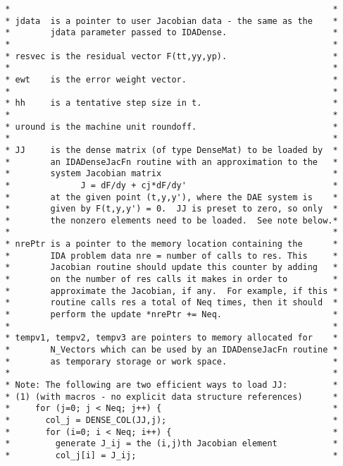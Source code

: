 \documentclass[11pt]{article}
\begin{document}
\begin{verbatim}
 *                                                                *
 * jdata  is a pointer to user Jacobian data - the same as the    *
 *        jdata parameter passed to IDADense.                     *
 *                                                                *
 * resvec is the residual vector F(tt,yy,yp).                     *
 *                                                                *
 * ewt    is the error weight vector.                             *
 *                                                                *
 * hh     is a tentative step size in t.                          *
 *                                                                *
 * uround is the machine unit roundoff.                           *
 *                                                                *
 * JJ     is the dense matrix (of type DenseMat) to be loaded by  *
 *        an IDADenseJacFn routine with an approximation to the   *
 *        system Jacobian matrix                                  *
 *              J = dF/dy + cj*dF/dy'                             *
 *        at the given point (t,y,y'), where the DAE system is    *
 *        given by F(t,y,y') = 0.  JJ is preset to zero, so only  *
 *        the nonzero elements need to be loaded.  See note below.*
 *                                                                *
 * nrePtr is a pointer to the memory location containing the      *
 *        IDA problem data nre = number of calls to res. This     *
 *        Jacobian routine should update this counter by adding   *
 *        on the number of res calls it makes in order to         *
 *        approximate the Jacobian, if any.  For example, if this *
 *        routine calls res a total of Neq times, then it should  *
 *        perform the update *nrePtr += Neq.                      *
 *                                                                *
 * tempv1, tempv2, tempv3 are pointers to memory allocated for    *
 *        N_Vectors which can be used by an IDADenseJacFn routine *
 *        as temporary storage or work space.                     *
 *                                                                *
 * Note: The following are two efficient ways to load JJ:         *
 * (1) (with macros - no explicit data structure references)      *
 *     for (j=0; j < Neq; j++) {                                  *
 *       col_j = DENSE_COL(JJ,j);                                 *
 *       for (i=0; i < Neq; i++) {                                *
 *         generate J_ij = the (i,j)th Jacobian element           *
 *         col_j[i] = J_ij;                                       *

\end{verbatim}
\end{document}
